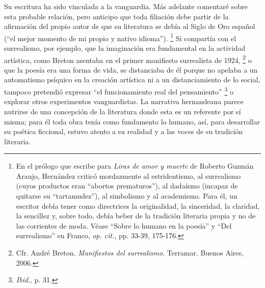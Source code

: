\documentclass[14pt,twoside,final]{extbook} %
\let\oldfootnote\footnote
\renewcommand\footnote[1]{%
\oldfootnote{\hspace{1mm}#1}}
\begin{document}
Su escritura ha sido vinculada a la vanguardia. Más adelante comentaré sobre esta probable relación, pero anticipo que toda filiación debe partir de la afirmación del propio autor de que su literatura se debía al Siglo de Oro español (``el mejor momento de mi propio y nativo idioma'').\footnote{En el prólogo que escribe para \emph{Liras de amor y muerte} de Roberto Guzmán Araujo, Hernández criticó mordazmente al estridentismo, al surrealismo (cuyos productos eran ``abortos prematuros''), al dadaísmo (incapaz de quitarse su ``tartamudez''), al simbolismo y al academismo. Para él, un escritor debía tener como directrices la originalidad, la sinceridad, la claridad, la sencillez y, sobre todo, debía beber de la tradición literaria propia y no de las corrientes de moda. Véase ``Sobre lo humano en la poesía'' y ``Del surrealismo'' en Franco, \emph{op. cit.}, pp. 33-39, 175-176.} Si compartía con el surrealismo, por ejemplo, que la imaginación era fundamental en la actividad artística, como Breton asentaba en el primer manifiesto surrealista de 1924,\footnote{Cfr. André Breton, \emph{Manifiestos del surrealismo}. Terramar, Buenos Aires, 2006.} o que la poesía era una forma de vida, se distanciaba de él porque no apelaba a un automatismo psíquico en la creación artística ni a un distanciamiento de lo social, tampoco pretendió expresar ``el funcionamiento real del pensamiento''\footnote{\emph{Ibid}., p. 31.} o explorar otros experimentos vanguardistas. La narrativa hernandeana parece nutrirse de una concepción de la literatura donde esta es un referente por sí misma; para él toda obra tenía como fundamento lo humano, así, para desarrollar su poética ficcional, estuvo atento a su realidad y a las voces de su tradición literaria.
\end{document}
